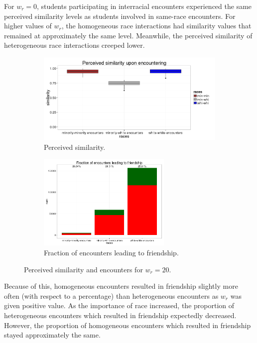 For $w_r=0$, students participating in interracial encounters experienced the same perceived similarity levels as students involved in same-race encounters. For higher values of 
$w_r$, the homogeneous race interactions had similarity values that remained at approximately the same level. Meanwhile, the perceived similarity of heterogeneous race interactions 
creeped lower.
\begin{figure}
\begin{subfigure}{.5\textwidth}
  \centering
    \includegraphics[width=\textwidth]{similarityBoxplots20.png}
      \caption{Perceived similarity.}
\end{subfigure}
\begin{subfigure}{.5\textwidth}
    \includegraphics[width=0.7\textwidth]{encountersGraph20.png}
      \caption{Fraction of encounters leading to friendship.}
\end{subfigure}
\caption{Perceived similarity and encounters for $w_r=20$.}
\end{figure}
Because of this, homogeneous encounters resulted in friendship slightly more 
often (with respect to a percentage) than heterogeneous encounters as $w_r$ was given positive value. As the importance of race increased, the proportion 
of heterogeneous encounters which resulted in friendship expectedly decreased. However, the proportion of homogeneous encounters 
which resulted in friendship stayed approximately the same.

